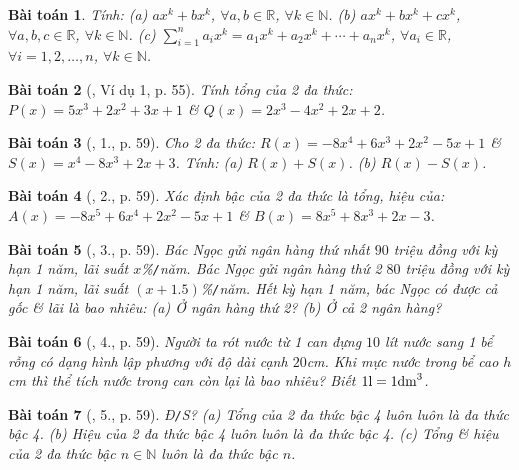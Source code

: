 \documentclass{article}
\newtheorem{baitoan}{Bài toán}
\begin{document}
\begin{baitoan}
	Tính: (a) $ax^k + bx^k$, $\forall a,b\in\mathbb{R}$, $\forall k\in\mathbb{N}$. (b) $ax^k + bx^k + cx^k$, $\forall a,b,c\in\mathbb{R}$, $\forall k\in\mathbb{N}$. (c) $\sum_{i=1}^n a_ix^k = a_1x^k + a_2x^k + \cdots + a_nx^k$, $\forall a_i\in\mathbb{R}$, $\forall i = 1,2,\ldots,n$, $\forall k\in\mathbb{N}$.
\end{baitoan}

\begin{baitoan}[\cite{SGK_Toan_7_Canh_Dieu_tap_2}, Ví dụ 1, p. 55]
	Tính tổng của 2 đa thức: $P(x) = 5x^3 + 2x^2 + 3x + 1$ \& $Q(x) = 2x^3 - 4x^2 + 2x + 2$.
\end{baitoan}

\begin{baitoan}[\cite{SGK_Toan_7_Canh_Dieu_tap_2}, 1., p. 59]
	Cho 2 đa thức: $R(x) = -8x^4 + 6x^3 + 2x^2 - 5x + 1$ \& $S(x) = x^4 - 8x^3 + 2x + 3$. Tính: (a) $R(x) + S(x)$. (b) $R(x) - S(x)$.
\end{baitoan}

\begin{baitoan}[\cite{SGK_Toan_7_Canh_Dieu_tap_2}, 2., p. 59]
	Xác định bậc của 2 đa thức là tổng, hiệu của: $A(x) = -8x^5 + 6x^4 + 2x^2 - 5x + 1$ \& $B(x) = 8x^5 + 8x^3 + 2x - 3$.
\end{baitoan}

\begin{baitoan}[\cite{SGK_Toan_7_Canh_Dieu_tap_2}, 3., p. 59]
	Bác Ngọc gửi ngân hàng thứ nhất $90$ triệu đồng với kỳ hạn 1 năm, lãi suất $x$\%\emph{\texttt{/}}năm. Bác Ngọc gửi ngân hàng thứ 2 $80$ triệu đồng với kỳ hạn 1 năm, lãi suất $(x + 1.5)$\%\emph{\texttt{/}}năm. Hết kỳ hạn 1 năm, bác Ngọc có được cả gốc \& lãi là bao nhiêu: (a) Ở ngân hàng thứ 2? (b) Ở cả 2 ngân hàng?
\end{baitoan}

\begin{baitoan}[\cite{SGK_Toan_7_Canh_Dieu_tap_2}, 4., p. 59]
	Người ta rót nước từ 1 can đựng $10$ lít nước sang 1 bể rỗng có dạng hình lập phương với độ dài cạnh $20$\emph{cm}. Khi mực nước trong bể cao $h$ \emph{cm} thì thể tích nước trong can còn lại là bao nhiêu? Biết $1{\rm l} = 1{\rm dm}^3$.
\end{baitoan}

\begin{baitoan}[\cite{SGK_Toan_7_Canh_Dieu_tap_2}, 5., p. 59]
	\emph{Đ\texttt{/}S?} (a) Tổng của 2 đa thức bậc 4 luôn luôn là đa thức bậc 4. (b) Hiệu của 2 đa thức bậc 4 luôn luôn là đa thức bậc 4. (c) Tổng \& hiệu của 2 đa thức bậc $n\in\mathbb{N}$ luôn là đa thức bậc $n$.
\end{baitoan}
\end{document}
